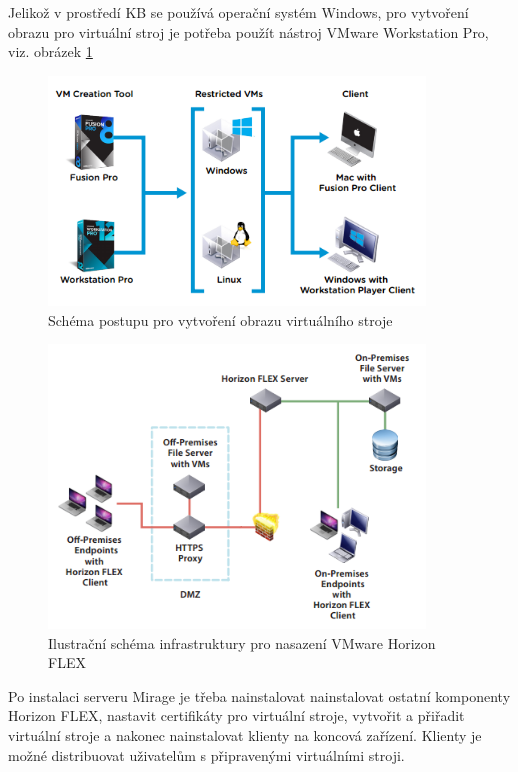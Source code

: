 Jelikož v prostředí KB se používá operační systém Windows, pro vytvoření obrazu pro virtuální stroj je potřeba použít nástroj VMware Workstation Pro, viz. obrázek \ref{workstation}

\begin{figure}[h!]
\centering
\includegraphics[width=10cm]{img/workstation}
\caption{Schéma postupu pro vytvoření obrazu virtuálního stroje}
\label{workstation}
\end{figure} 




\begin{figure}[h!]
\centering
\includegraphics[width=10cm]{img/schemaArchitektury}
\caption{Ilustrační schéma infrastruktury pro nasazení VMware Horizon FLEX}\label{schemaArchitektury}
\end{figure} 


Po instalaci serveru Mirage je třeba nainstalovat nainstalovat ostatní komponenty Horizon FLEX, nastavit certifikáty pro virtuální stroje, vytvořit a přiřadit virtuální stroje a nakonec nainstalovat klienty na koncová zařízení. Klienty je možné distribuovat uživatelům s připravenými virtuálními stroji. 

